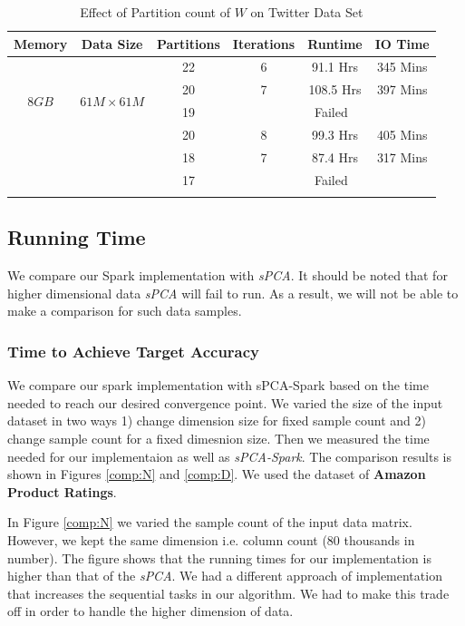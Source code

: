 \documentclass[12pt,notitlepage,oneside]{report}
\begin{document}
\begin{table}[!htbp]
    \centering
    \begin{tabular}{|c|c|c|c|c|c|}
    \hline
    Memory &Data Size &Partitions &Iterations &Runtime &IO Time \\
    \hline
    \multirow{4}{17pt}{$8GB$}  & \multirow{4}{7em}{$61M \times 61M$} &22  &6		&91.1 Hrs   	  &345 Mins\\
    \cline{3-6}
         & & 20 &7		&108.5 Hrs   	  &397 Mins\\
    \cline{3-6}
         & & 19 &\multicolumn{3}{|c|}{Failed} \\
    \hline
    
    \multirow{4}{17pt}{$12GB$}  & \multirow{4}{7em}{$61M \times 61M$} &20  &8		&99.3 Hrs   	  &405 Mins\\
    \cline{3-6}
         & & 18 &7		&87.4 Hrs   	  &317 Mins\\
    \cline{3-6}
         & & 17 &\multicolumn{3}{|c|}{Failed} \\
    \hline
    \multicolumn{6}{c}{}
    \end{tabular}
    \caption{Effect of Partition count of $W$ on Twitter Data Set }
    \label{tab:twitter_partition}
\end{table}

\subsection{Running Time}
We compare our Spark implementation with \textit{sPCA}. It should be noted that for higher dimensional data \textit{sPCA} will fail to run. As a result, we will not be able to make a comparison for such data samples.

\subsubsection{Time to Achieve Target Accuracy}
We compare our spark implementation with sPCA-Spark based on the time needed to reach our desired convergence point. We varied the size of the input dataset in two ways 1) change dimension size for fixed sample count and 2) change sample count for a fixed dimesnion size. Then we measured the time needed for our implementaion as well as \textit{sPCA-Spark}. The comparison results is shown in Figures \ref{comp:N} and \ref{comp:D}. We used the dataset of \textbf{Amazon Product Ratings}.

In Figure \ref{comp:N} we varied the sample count of the input data matrix. However, we kept the same dimension i.e. column count ($80$ thousands in number). The figure shows that the running times for our implementation is higher than that of the \textit{sPCA}. We had a different approach of implementation that increases the sequential tasks in our algorithm. We had to make this trade off in order to handle the higher dimension of data. 
\end{document}
